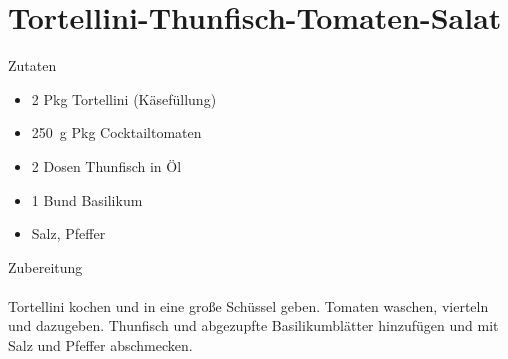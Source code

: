 \section*{Tortellini-Thunfisch-Tomaten-Salat}
\ihead{}\ohead{}
\cfoot{}
{\Large Zutaten}
\begin{multicols}{2}
\begin{itemize}
    \item \num{2} Pkg Tortellini (Käsefüllung)
    \item \SI{250}{g} Pkg Cocktailtomaten 
    \item \num{2} Dosen Thunfisch in Öl
    \item \num{1} Bund Basilikum
    \item Salz, Pfeffer
\end{itemize}
\end{multicols}
\noindent
{\Large Zubereitung}\\
\\
Tortellini kochen und in eine große Schüssel geben. 
Tomaten waschen, vierteln und dazugeben.
Thunfisch und abgezupfte Basilikumblätter hinzufügen und mit Salz und Pfeffer abschmecken.